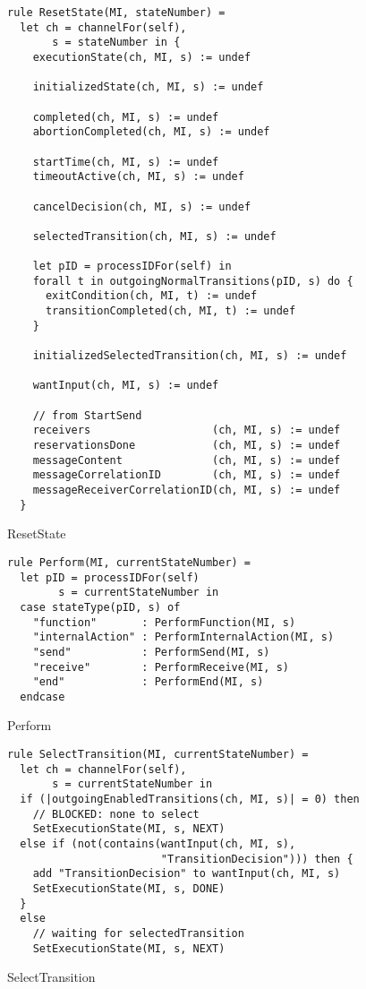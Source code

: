 \begin{listing}[H]
\begin{verbatim}
rule ResetState(MI, stateNumber) =
  let ch = channelFor(self),
       s = stateNumber in {
    executionState(ch, MI, s) := undef

    initializedState(ch, MI, s) := undef

    completed(ch, MI, s) := undef
    abortionCompleted(ch, MI, s) := undef

    startTime(ch, MI, s) := undef
    timeoutActive(ch, MI, s) := undef

    cancelDecision(ch, MI, s) := undef

    selectedTransition(ch, MI, s) := undef

    let pID = processIDFor(self) in
    forall t in outgoingNormalTransitions(pID, s) do {
      exitCondition(ch, MI, t) := undef
      transitionCompleted(ch, MI, t) := undef
    }

    initializedSelectedTransition(ch, MI, s) := undef

    wantInput(ch, MI, s) := undef

    // from StartSend
    receivers                   (ch, MI, s) := undef
    reservationsDone            (ch, MI, s) := undef
    messageContent              (ch, MI, s) := undef
    messageCorrelationID        (ch, MI, s) := undef
    messageReceiverCorrelationID(ch, MI, s) := undef
  }
\end{verbatim}
\caption{ResetState}
\label{lst:asm:ResetState}
\end{listing}




\begin{listing}[H]
\begin{verbatim}
rule Perform(MI, currentStateNumber) =
  let pID = processIDFor(self)
        s = currentStateNumber in
  case stateType(pID, s) of
    "function"       : PerformFunction(MI, s)
    "internalAction" : PerformInternalAction(MI, s)
    "send"           : PerformSend(MI, s)
    "receive"        : PerformReceive(MI, s)
    "end"            : PerformEnd(MI, s)
  endcase
\end{verbatim}
\caption{Perform}
\label{lst:asm:Perform}
\end{listing}


\begin{listing}[H]
\begin{verbatim}
rule SelectTransition(MI, currentStateNumber) =
  let ch = channelFor(self),
       s = currentStateNumber in
  if (|outgoingEnabledTransitions(ch, MI, s)| = 0) then
    // BLOCKED: none to select
    SetExecutionState(MI, s, NEXT)
  else if (not(contains(wantInput(ch, MI, s),
                        "TransitionDecision"))) then {
    add "TransitionDecision" to wantInput(ch, MI, s)
    SetExecutionState(MI, s, DONE)
  }
  else
    // waiting for selectedTransition
    SetExecutionState(MI, s, NEXT)
\end{verbatim}
\caption{SelectTransition}
\label{lst:asm:SelectTransition}
\end{listing}



